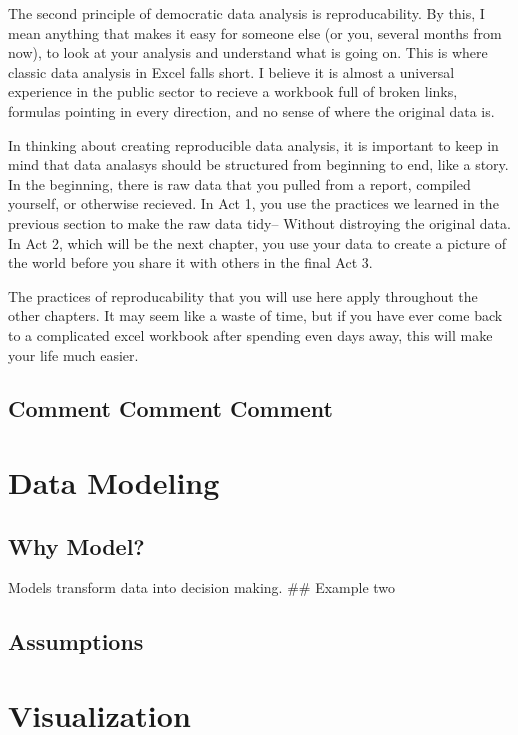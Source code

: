 \documentclass[]{book}
\begin{document}
The second principle of democratic data analysis is reproducability. By
this, I mean anything that makes it easy for someone else (or you,
several months from now), to look at your analysis and understand what
is going on. This is where classic data analysis in Excel falls short. I
believe it is almost a universal experience in the public sector to
recieve a workbook full of broken links, formulas pointing in every
direction, and no sense of where the original data is.

In thinking about creating reproducible data analysis, it is important
to keep in mind that data analasys should be structured from beginning
to end, like a story. In the beginning, there is raw data that you
pulled from a report, compiled yourself, or otherwise recieved. In Act
1, you use the practices we learned in the previous section to make the
raw data tidy-- Without distroying the original data. In Act 2, which
will be the next chapter, you use your data to create a picture of the
world before you share it with others in the final Act 3.

The practices of reproducability that you will use here apply throughout
the other chapters. It may seem like a waste of time, but if you have
ever come back to a complicated excel workbook after spending even days
away, this will make your life much easier.

\section{Comment Comment Comment}\label{comment-comment-comment}

\chapter{Data Modeling}\label{data-modeling}

\section{Why Model?}\label{why-model}

Models transform data into decision making. \#\# Example two

\section{Assumptions}\label{assumptions}

\chapter{Visualization}\label{visualization}
\end{document}
